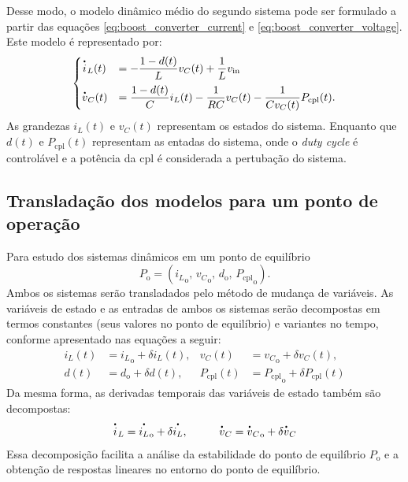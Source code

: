 Desse modo, o modelo dinâmico médio do segundo sistema pode ser formulado a partir das equações \eqref{eq:boost_converter_current} e \eqref{eq:boost_converter_voltage}. Este modelo é representado por: \begin{equation} \begin{cases} \dt{i}_L(t) &= \displaystyle - \frac{1-d(t)}{L}v_C(t) + \frac{1}{L}v_{\mathrm{in}} \\[8pt] \dt{v}_C(t) &= \displaystyle \frac{1 - d(t)}{C} i_L(t) - \frac{1}{RC}v_C(t) - \frac{1}{Cv_C(t)}P_{\mathrm{cpl}}(t). \label{eq:boost_nonlinear_system}\end{cases} \end{equation} As grandezas $i_L(t)$ e $v_C(t)$ representam os estados do sistema. Enquanto que $d(t)$ e $P_{\mathrm{cpl}}(t)$ representam as entadas do sistema, onde o \textit{duty cycle }é controlável e a potência da \acrshort{cpl} é considerada a pertubação do sistema.

\subsection{Transladação dos modelos para um ponto de operação}

Para estudo dos sistemas dinâmicos em um ponto de equilíbrio \begin{equation} P_{\mathrm{o}} = \left({i_L}_{\mathrm{o}}, \, {v_C}_{\mathrm{o}}, \, d_{\mathrm{o}}, \, {P_{\mathrm{cpl}}}_{\mathrm{o}} \right). \label{eq:operation_point} \end{equation} Ambos os sistemas serão transladados pelo método de mudança de variáveis. As variáveis de estado e as entradas de ambos os sistemas serão decompostas em termos constantes (seus valores no ponto de equilíbrio) e variantes no tempo, conforme apresentado nas equações a seguir: \begin{align}
  {i_L}(t) & = {i_L}_{\mathrm{o}} + \delta i_L(t), & {v_C}(t)     & = {v_C}_{\mathrm{o}} + \delta v_C(t), \label{eq:tranlation_decomposed_states}        \\[8pt]
  {d}(t)   & = d_{\mathrm{o}} + \delta d(t),       & {P_{\mathrm{cpl}}}(t) & = {P_{\mathrm{cpl}}}_{\mathrm{o}} + \delta P_{\mathrm{cpl}}(t) \label{eq:tranlation_decomposed_inputs}
\end{align} Da mesma forma, as derivadas temporais das variáveis de estado também são decompostas: \begin{align}
  \dt{i}_L = {\dt{i_L}}_{\mathrm{o}} + \delta \dt{i_L}, \hspace{1cm}
  \dt{v}_C = {\dt{v}_C}_{\mathrm{o}} + \delta \dt{v}_C
\end{align} Essa decomposição facilita a análise da estabilidade do ponto de equilíbrio $P_{\mathrm{o}}$ e a obtenção de respostas lineares no entorno do ponto de equilíbrio.

